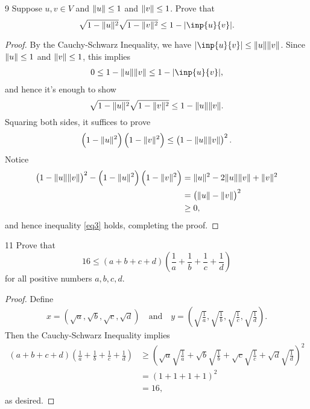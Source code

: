 \documentclass{extarticle}
\newenvironment{problem}[1]{\begin{prob*}{#1}{}}{\end{prob*}}
\DeclarePairedDelimiter\Mod{\lvert}{\rvert}
\DeclarePairedDelimiter\Norm{\lVert}{\rVert}
\begin{document}
\begin{problem}{9}
Suppose $u,v\in V$ and $\Norm{u}\leq 1$ and $\Norm{v}\leq 1$.  Prove that 
\begin{equation*}
\sqrt{1 - \Norm{u}^2}\sqrt{1 - \Norm{v}^2}\leq 1 - \Mod{\inp{u}{v}}.
\end{equation*}
\end{problem}
\begin{proof}
By the Cauchy-Schwarz Inequality, we have $\Mod{\inp{u}{v}}\leq \Norm{u}\Norm{v}$.  Since $\Norm{u}\leq 1$ and $\Norm{v}\leq 1$, this implies
\begin{align*}
0 \leq 1 -\Norm{u}\Norm{v} \leq 1 -\Mod{\inp{u}{v}},
\end{align*}
and hence it's enough to show
\begin{equation*}
\sqrt{1 - \Norm{u}^2}\sqrt{1 - \Norm{v}^2} \leq 1 -\Norm{u}\Norm{v}.
\end{equation*}
Squaring both sides, it suffices to prove 
\begin{equation}
\left(1 - \Norm{u}^2\right)\left(1 - \Norm{v}^2\right) \leq \left(1 -\Norm{u}\Norm{v}\right)^2. \label{eq3}
\end{equation}
Notice
\begin{align*}
\left(1 -\Norm{u}\Norm{v}\right)^2 - \left(1 - \Norm{u}^2\right)\left(1 - \Norm{v}^2\right) &= \Norm{u}^2 - 2\Norm{u}\Norm{v} + \Norm{v}^2\\
&= \left(\Norm{u} - \Norm{v}\right)^2\\
&\geq 0,
\end{align*}
and hence inequality \eqref{eq3} holds, completing the proof.
\end{proof}

\begin{problem}{11}
Prove that
\begin{equation*}
16 \leq (a + b + c + d)\left(\frac{1}{a} + \frac{1}{b} + \frac{1}{c} + \frac{1}{d}\right)
\end{equation*}
for all positive numbers $a,b,c,d$.
\end{problem}
\begin{proof}
Define
\begin{align*}
x = \left(\sqrt{a}, \sqrt{b}, \sqrt{c}, \sqrt{d} \right)\quad\text{and}\quad y = \left(\sqrt{\frac{1}{a}}, \sqrt{\frac{1}{b}}, \sqrt{\frac{1}{c}}, \sqrt{\frac{1}{d}}\right).
\end{align*}
Then the Cauchy-Schwarz Inequality implies
\begin{align*}
(a + b + c + d)\left(\frac{1}{a} + \frac{1}{b} + \frac{1}{c} + \frac{1}{d}\right) &\geq \left(\sqrt{a}\sqrt{\frac{1}{a}} + \sqrt{b}\sqrt{\frac{1}{b}} + \sqrt{c}\sqrt{\frac{1}{c}} + \sqrt{d}\sqrt{\frac{1}{d}}\right)^2\\
&= (1 + 1 + 1 + 1)^2\\
&= 16,
\end{align*}
as desired.
\end{proof}
\end{document}
